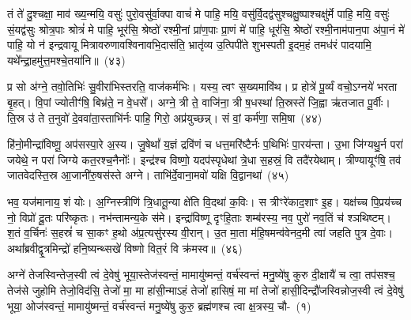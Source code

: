 तं ते॑ दु॒श्चक्षा॒ माव॑ ख्य॒न्मयि॒ वसुः॑ पुरो॒वसु॑र्वा॒क्पा वाचं॑ मे पाहि॒ मयि॒ वसु॑र्वि॒दद्व॑सुश्चक्षु॒ष्पाश्चक्षु॑र्मे पाहि॒ मयि॒ वसुः॑ सं॒यद्व॑सुः श्रोत्र॒पाः श्रोत्रं॑ मे पाहि॒ भूर॑सि॒ श्रेष्ठो॑ रश्मी॒नां प्रा॑ण॒पाः प्रा॒णं मे॑ पाहि॒ धूर॑सि॒ श्रेष्ठो॑ रश्मी॒नाम॑पान॒पा अ॑पा॒नं मे॑ पाहि॒ यो न॑ इन्द्रवायू मित्रावरुणावश्विनावभि॒दास॑ति॒ भ्रातृ॑व्य उ॒त्पिपी॑ते शुभस्पती इ॒दम॒हं तमध॑रं पादयामि॒ यथे᳚न्द्रा॒हमु॑त्त॒मश्चे॒तया॑नि॥~(४३)

{\anuvakamend[{र॒क्ष॒स्व॒ भ्रातृ॑व्य॒स्त्रयो॑दश च}]}%

प्र सो अ॑ग्ने॒ तवो॒तिभिः॑ सु॒वीरा॑भिस्तरति॒ वाज॑कर्मभिः। यस्य॒ त्वꣳ स॒ख्यमावि॑थ। प्र होत्रे॑ पू॒र्व्यं वचो॒\-ऽग्नये॑ भरता बृ॒हत्। वि॒पां ज्योतीꣳ॑षि॒ बिभ्र॑ते॒ न वे॒धसे᳚। अग्ने॒ त्री ते॒ वाजि॑ना॒ त्री ष॒धस्था॑ ति॒स्रस्ते॑ जि॒ह्वा ऋ॑तजात पू॒र्वीः। ति॒स्र उ॑ ते त॒नुवो॑ दे॒ववा॑ता॒स्ताभि॑र्नः पाहि॒ गिरो॒ अप्र॑युच्छन्न्। सं वां॒ कर्म॑णा॒ समि॒षा~(४४)

हि॑नो॒मीन्द्रा॑विष्णू॒ अप॑सस्पा॒रे अ॒स्य। जु॒षेथां᳚ य॒ज्ञं द्रवि॑णं च धत्त॒मरि॑ष्टैर्नः प॒थिभिः॑ पा॒रय॑न्ता। उ॒भा जि॑ग्यथु॒र्न परा॑ जयेथे॒ न परा॑ जिग्ये कत॒रश्च॒नैनोः᳚। इन्द्र॑श्च विष्णो॒ यदप॑स्पृधेथां त्रे॒धा स॒हस्रं॒ वि तदै॑रयेथाम्। त्रीण्यायूꣳ॑षि॒ तव॑ जातवेदस्ति॒स्र आ॒जानी॑रु॒षस॑स्ते अग्ने। ताभि॑र्दे॒वाना॒मवो॑ यक्षि वि॒द्वानथा॑~(४५)

भव॒ यज॑मानाय॒ शं योः। अ॒ग्निस्त्रीणि॑ त्रि॒धातू॒न्या क्षे॑ति वि॒दथा॑ क॒विः। स त्रीꣳरे॑काद॒शाꣳ इ॒ह। यक्ष॑च्च पि॒प्रय॑च्च नो॒ विप्रो॑ दू॒तः परि॑ष्कृतः। नभ॑न्तामन्य॒के स॑मे। इन्द्रा॑विष्णू दृꣳहि॒ताः शम्ब॑रस्य॒ नव॒ पुरो॑ नव॒तिं च॑ श्ञथिष्टम्। श॒तं व॒र्चिनः॑ स॒हस्रं॑ च सा॒कꣳ ह॒थो अ॑प्र॒त्यसु॑रस्य वी॒रान्। उ॒त मा॒ता म॑हि॒षमन्व॑वेनद॒मी त्वा॑ जहति पुत्र दे॒वाः। अथा᳚ब्रवीद्वृ॒त्रमिन्द्रो॑ हनि॒ष्यन्थ्सखे॑ विष्णो वित॒रं वि क्र॑मस्व॥~(४६)


{\anuvakamend[{इ॒षा\-ऽथ॑ त्वा॒ त्रयो॑दश च}]}%

{\prashnaend[{यो वै स्फ्यः स्व॒स्तिः स्व॒धायै॒ नमः॒ प्र मु़॑ञ्च॒ तिष्ठ॑तीव॒ षट्च॑त्वारिꣳशत्॥४६॥ यो वै पव॑मानानां॒ वि क्र॑मस्व॥}]}

\setcounter{anuvakam}{0}
अग्ने॑ तेजस्विन्तेज॒स्वी त्वं दे॒वेषु॑ भूया॒स्तेज॑स्वन्तं॒ मामायु॑ष्मन्तं॒ वर्च॑स्वन्तं मनु॒ष्ये॑षु कुरु दी॒क्षायै॑ च त्वा॒ तप॑सश्च॒ तेज॑से जुहोमि तेजो॒विद॑सि॒ तेजो॑ मा॒ मा हा॑सी॒न्मा\-ऽहं तेजो॑ हासिषं॒ मा मां तेजो॑ हासी॒दिन्द्रौ॑जस्विन्नोज॒स्वी त्वं दे॒वेषु॑ भूया॒ ओज॑स्वन्तं॒ मामायु॑ष्मन्तं॒ वर्च॑स्वन्तं मनु॒ष्ये॑षु कुरु॒ ब्रह्म॑णश्च त्वा क्ष॒त्रस्य॒ चौ-~(१)

